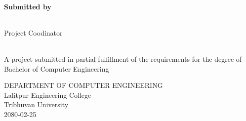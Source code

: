 \begin{center}
    \linespread{1.6}
    \thispagestyle{empty}
    \textbf{\large{\thetitle}} \\
    \vspace{2cm}

    \textbf{Submitted by} \\
    {\theauthor} \\

    \vspace{2cm}

    Project Coodinator\\
    {\thesupervisor} \\

    \vspace{2.2cm}

    A project submitted in partial fulfillment of the requirements for the degree of\\
    Bachelor of Computer Engineering

    \vspace{2.2cm}

    DEPARTMENT OF COMPUTER ENGINEERING \\
    Lalitpur Engineering College\\
    Tribhuvan University\\
    \vspace{1.3 in}
    2080-02-25

\end{center}

